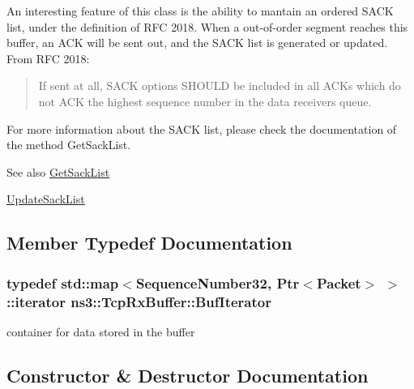 An interesting feature of this class is the ability to mantain an ordered S\+A\+CK list, under the definition of R\+FC 2018. When a out-\/of-\/order segment reaches this buffer, an A\+CK will be sent out, and the S\+A\+CK list is generated or updated. From R\+FC 2018\+:

\begin{quote}
If sent at all, S\+A\+CK options S\+H\+O\+U\+LD be included in all A\+C\+Ks which do not A\+CK the highest sequence number in the data receiver\textquotesingle{}s queue. \end{quote}


For more information about the S\+A\+CK list, please check the documentation of the method Get\+Sack\+List.

\begin{DoxySeeAlso}{See also}
\hyperlink{classns3_1_1TcpRxBuffer_afc5d672da4595330754de1bb3933a9c7}{Get\+Sack\+List} 

\hyperlink{classns3_1_1TcpRxBuffer_abd2afbae9205cd763f48a458d001d2d5}{Update\+Sack\+List} 
\end{DoxySeeAlso}


\subsection{Member Typedef Documentation}
\subsubsection[{\texorpdfstring{Buf\+Iterator}{BufIterator}}]{\setlength{\rightskip}{0pt plus 5cm}typedef std\+::map$<${\bf Sequence\+Number32}, {\bf Ptr}$<${\bf Packet}$>$ $>$\+::iterator {\bf ns3\+::\+Tcp\+Rx\+Buffer\+::\+Buf\+Iterator}\hspace{0.3cm}{\ttfamily [private]}}\hypertarget{classns3_1_1TcpRxBuffer_a6d8a168521cf993cc3dec893067dcb62}{}\label{classns3_1_1TcpRxBuffer_a6d8a168521cf993cc3dec893067dcb62}


container for data stored in the buffer 



\subsection{Constructor \& Destructor Documentation}
